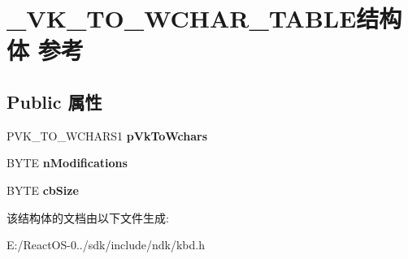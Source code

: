 \hypertarget{struct___v_k___t_o___w_c_h_a_r___t_a_b_l_e}{}\section{\+\_\+\+V\+K\+\_\+\+T\+O\+\_\+\+W\+C\+H\+A\+R\+\_\+\+T\+A\+B\+L\+E结构体 参考}
\label{struct___v_k___t_o___w_c_h_a_r___t_a_b_l_e}
\subsection*{Public 属性}
\begin{DoxyCompactItemize}
\item 
\mbox{\label{struct___v_k___t_o___w_c_h_a_r___t_a_b_l_e_a73fa9e3c9a05615afe30c2c0a302dd78}} 
P\+V\+K\+\_\+\+T\+O\+\_\+\+W\+C\+H\+A\+R\+S1 {\bfseries p\+Vk\+To\+Wchars}
\item 
\mbox{\label{struct___v_k___t_o___w_c_h_a_r___t_a_b_l_e_ac10b1a27a4e218ab281b7a4e97f63c2f}} 
B\+Y\+TE {\bfseries n\+Modifications}
\item 
\mbox{\label{struct___v_k___t_o___w_c_h_a_r___t_a_b_l_e_a62cb140c8f71e24b6155c48cc16540c4}} 
B\+Y\+TE {\bfseries cb\+Size}
\end{DoxyCompactItemize}


该结构体的文档由以下文件生成\+:\begin{DoxyCompactItemize}
\item 
E\+:/\+React\+O\+S-\/0../sdk/include/ndk/kbd.\+h\end{DoxyCompactItemize}
